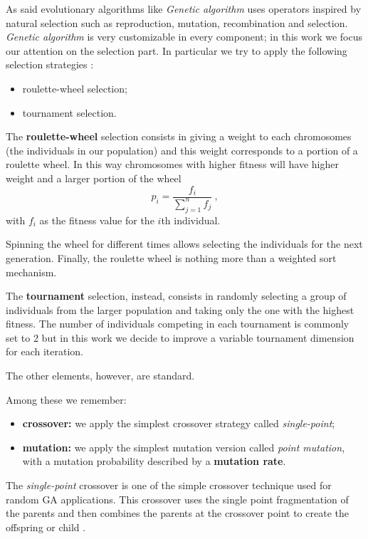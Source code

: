 \documentclass[10pt]{article}
\begin{document}
As said evolutionary algorithms like \textit{Genetic algorithm} uses operators inspired by natural selection such as reproduction, mutation, recombination and selection.
\textit{Genetic algorithm} is very customizable in every component; in this work we focus our attention on the selection part.
In particular we try to apply the following selection strategies \cite{ventuno}:
\begin{itemize}
\item roulette-wheel selection;
\item tournament selection.
\end{itemize}
The \textbf{roulette-wheel} selection consists in giving a weight to each chromosomes (the individuals in our population) and this weight corresponds to a portion of a roulette wheel.
In this way chromosomes with higher fitness will have higher weight and a larger portion of the wheel
\begin{equation}
p_i = \frac{f_i}{\sum_{j = 1}^n f_j} ~,
\end{equation}
with $f_i$ as the fitness value for the $i$th individual.

Spinning the wheel for different times allows selecting the individuals for the next generation.
Finally, the roulette wheel is nothing more than a weighted sort mechanism.

The \textbf{tournament} selection, instead, consists in randomly selecting a group of individuals from the larger population and taking only the one with the highest fitness. 
The number of individuals competing in each tournament is commonly set to 2 but in this work we decide to improve a variable tournament dimension for each iteration.

The other elements, however, are standard.

Among these we remember:
\begin{itemize}
\item \textbf{crossover:} we apply the simplest crossover strategy called \textit{single-point};
\item \textbf{mutation:} we apply the simplest mutation version called \textit{point mutation}, with a mutation probability described by a \textbf{mutation rate}.
\end{itemize}
The \textit{single-point} crossover is one of the simple crossover technique used for random GA applications. This crossover uses the single point fragmentation of the parents and then combines the parents at the crossover point to create the offspring or child \cite{venticinque}.
\end{document}
